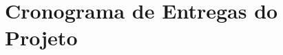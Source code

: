 \documentclass[ruledheader, 12pt, onecolumn, a4paper] {report}%
\begin{document}
\chapter{Cronograma de Entregas do Projeto}
%
%
\end{document}
